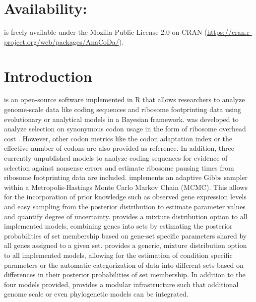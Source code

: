 \section*{Availability:}
\textbf{\package} is freely available under the Mozilla Public License 2.0
on CRAN (\url{https://cran.r-project.org/web/packages/AnaCoDa/}).


\newpage

\section{Introduction}

\package is  an open-source software implemented in R \citep{rcore} that allows researchers to analyze genome-scale data like coding sequences and ribosome footprinting data using evolutionary or analytical models in a Bayesian framework. 
\package was developed to analyze selection on synonymous codon usage in the form of ribosome overhead cost \citep{gilchrist2015,wallace2013,shah2011}.
However, other codon metrics like the codon adaptation index \citep{sharp1987} or the effective number of codons \citep{Wright1990} are also provided as reference.
In addition, three currently unpublished models to analyze coding sequences for evidence of selection against nonsense errors and estimate ribosome pausing times from ribosome footprinting data are included.
\package implements an adaptive Gibbs sampler within a Metropolis-Hastings Monte Carlo Markov Chain (MCMC). 
This allows for the incorporation of prior knowledge such as observed gene expression levels and easy sampling from the posterior distribution to estimate parameter values and quantify degree of uncertainty.
\package provides a mixture distribution option to all implemented models, combining genes into sets by estimating the posterior probabilities of set membership based on gene-set specific parameters shared by all genes assigned to a given set. 
\package provides a generic, mixture distribution option to all implemented models, allowing for the estimation of condition specific parameters or the automatic categorization of data into different sets based on differences in their posterior probabilities of set membership.
In addition to the four models provided, \package provides a modular infrastructure such that additional genome scale or even phylogenetic models can be integrated.

